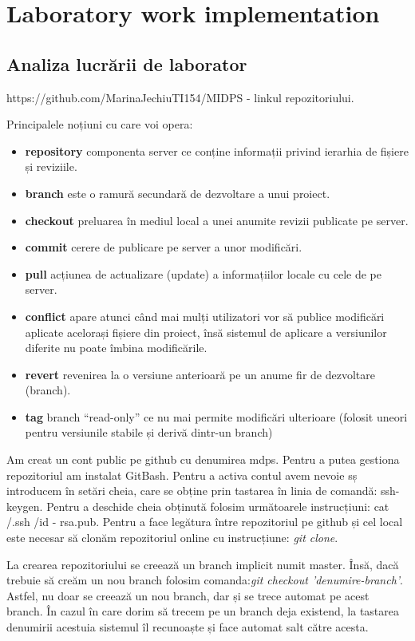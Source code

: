 \section{Laboratory work implementation}

\subsection{Analiza lucrării de laborator}

	https://github.com/MarinaJechiuTI154/MIDPS - linkul repozitoriului.

	Principalele noțiuni cu care voi opera:
	\begin{itemize}
	\item \textbf{repository}  componenta server ce conține informații privind ierarhia de fișiere și reviziile.
	\item \textbf{branch} este o ramură secundară de dezvoltare a unui proiect.
	\item \textbf{checkout}  preluarea în mediul local a unei anumite revizii publicate pe server.
	\item \textbf{commit} cerere de publicare pe server a unor modificări.
	\item \textbf{pull} acțiunea de actualizare (update) a informațiilor locale cu cele de pe server.
	\item \textbf{conflict} apare atunci când mai mulți utilizatori vor să publice modificări aplicate acelorași fișiere din proiect, însă sistemul de aplicare a versiunilor diferite nu poate îmbina modificările.
	\item \textbf{revert} revenirea la o versiune anterioară pe un anume fir de dezvoltare (branch).
	\item \textbf{tag} branch “read-only” ce nu mai permite modificări ulterioare (folosit uneori pentru versiunile stabile și derivă dintr-un branch)
	\end{itemize}
	
	Am creat un cont public pe github cu denumirea mdps. Pentru a putea gestiona repozitoriul am instalat GitBash. Pentru a activa contul avem nevoie sș introducem în  setări cheia, care se obține prin tastarea în linia de comandă: ssh-keygen. Pentru a deschide cheia obținută folosim următoarele instrucțiuni:  cat ~ /.ssh /id - rsa.pub. Pentru a face legătura între repozitoriul pe github și cel local este necesar să clonăm repozitoriul online cu instrucțiune: \textit{git clone}.
	
	La crearea repozitoriului se creează un branch implicit numit master. Însă, dacă trebuie să creăm un nou branch folosim comanda:\textit{git checkout 'denumire-branch'}. Astfel, nu doar se creează un nou branch, dar și se trece automat pe acest branch. În cazul în care dorim să trecem pe un branch deja existend, la tastarea denumirii acestuia sistemul îl recunoaște și face automat salt către acesta. 
	

